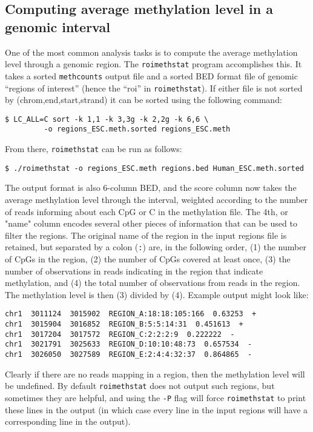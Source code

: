 \documentclass[10pt]{article}
\newcommand{\prog}[1]{\texttt{#1}}
\newcommand{\lit}[1]{\texttt{#1}}
\newcommand{\op}[1]{\texttt{#1}}
\begin{document}

\subsection{Computing average methylation level in a genomic interval}
\label{sec:roimethstat}

One of the most common analysis tasks is to compute the average
methylation level through a genomic region. The \prog{roimethstat}
program accomplishes this. It takes a sorted \prog{methcounts} output
file and a sorted BED format file of genomic ``regions of interest''
(hence the ``roi'' in \prog{roimethstat}).  If either file is not
sorted by (chrom,end,start,strand) it can be sorted using the
following command:
\begin{verbatim}
$ LC_ALL=C sort -k 1,1 -k 3,3g -k 2,2g -k 6,6 \
         -o regions_ESC.meth.sorted regions_ESC.meth
\end{verbatim}
From there, \prog{roimethstat} can be run as follows:
\begin{verbatim}
$ ./roimethstat -o regions_ESC.meth regions.bed Human_ESC.meth.sorted
\end{verbatim}
The output format is also 6-column BED, and the score column now takes
the average methylation level through the interval, weighted according
to the number of reads informing about each CpG or C in the
methylation file. The 4th, or "name" column encodes several other
pieces of information that can be used to filter the regions. The
original name of the region in the input regions file is retained, but
separated by a colon (\lit{:}) are, in the following order, (1) the
number of CpGs in the region, (2) the number of CpGs covered at least
once, (3) the number of observations in reads indicating in the region
that indicate methylation, and (4) the total number of observations
from reads in the region. The methylation level is then (3) divided by
(4). Example output might look like:
\begin{verbatim}
chr1  3011124  3015902  REGION_A:18:18:105:166  0.63253  +
chr1  3015904  3016852  REGION_B:5:5:14:31  0.451613  +
chr1  3017204  3017572  REGION_C:2:2:2:9  0.222222  -
chr1  3021791  3025633  REGION_D:10:10:48:73  0.657534  -
chr1  3026050  3027589  REGION_E:2:4:4:32:37  0.864865  -
\end{verbatim}
Clearly if there are no reads mapping in a region, then the
methylation level will be undefined. By default \prog{roimethstat}
does not output such regions, but sometimes they are helpful, and
using the \op{-P} flag will force \prog{roimethstat} to print these
lines in the output (in which case every line in the input regions
will have a corresponding line in the output).
\end{document}
